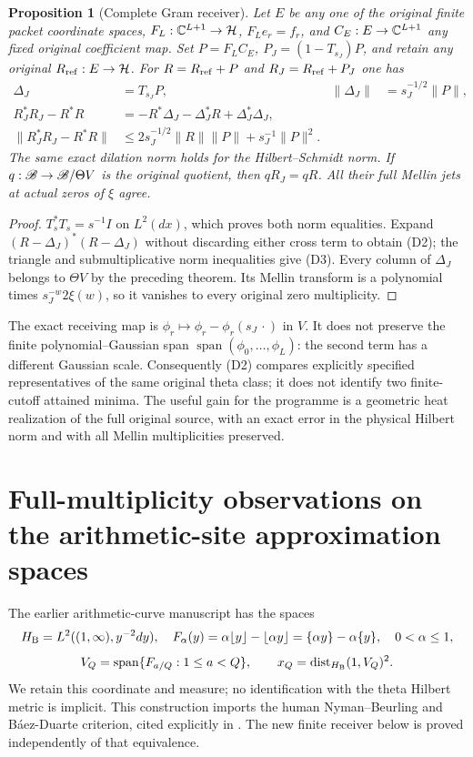 \documentclass[11pt]{article}
\newtheorem{proposition}[theorem]{Proposition}
\begin{document}
\begin{proposition}[Complete Gram receiver]\label{prop:dyadic-gram}
Let $E$ be any one of the original finite packet coordinate spaces,
$F_L:\mathbb C^{L+1}\to\mathcal H$, $F_Le_r=f_r$, and
$C_E:E\to\mathbb C^{L+1}$ any fixed original coefficient map. Set
$P=F_LC_E$, $P_J=(1-T_{s_J})P$, and retain any original
$R_{\rm ref}:E\to\mathcal H$. For $R=R_{\rm ref}+P$ and
$R_J=R_{\rm ref}+P_J$ one has
\begin{align}
 \Delta_J&=T_{s_J}P, & \|\Delta_J\|&=s_J^{-1/2}\|P\|,\nonumber\\
 R_J^*R_J-R^*R
   &=-R^*\Delta_J-\Delta_J^*R+\Delta_J^*\Delta_J,\tag{D2}\\
 \|R_J^*R_J-R^*R\|
   &\leq2s_J^{-1/2}\|R\|\|P\|+s_J^{-1}\|P\|^2.\tag{D3}
\end{align}
The same exact dilation norm holds for the Hilbert--Schmidt norm.
If $q:\mathscr B\to\mathscr B/\Theta V$ is the original quotient, then
$qR_J=qR$. All their full Mellin jets at actual zeros of $\xi$ agree.
\end{proposition}
\begin{proof}
$T_s^*T_s=s^{-1}I$ on $L^2(dx)$, which proves both norm equalities.
Expand $(R-\Delta_J)^*(R-\Delta_J)$ without discarding either cross term
to obtain (D2); the triangle and submultiplicative norm inequalities
give (D3). Every column of $\Delta_J$ belongs to $\Theta V$ by the
preceding theorem. Its Mellin transform is a polynomial times
$s_J^{-w}2\xi(w)$, so it vanishes to every original zero multiplicity.
\end{proof}

The exact receiving map is
$\phi_r\mapsto\phi_r-\phi_r(s_J\,\cdot)$ in $V$.
It does not preserve the finite polynomial--Gaussian span
$\operatorname{span}(\phi_0,\ldots,\phi_L)$: the second term has a
different Gaussian scale. Consequently (D2) compares explicitly specified
representatives of the same original theta class; it does not identify two
finite-cutoff attained minima. The useful gain for the programme is a
geometric heat realization of the full original source, with an exact error
in the physical Hilbert norm and with all Mellin multiplicities preserved.

\section{Full-multiplicity observations on the arithmetic-site approximation spaces}
The earlier arithmetic-curve manuscript has the spaces
\[
 H_{\rm B}=L^2((1,\infty),y^{-2}dy),\quad
 F_\alpha(y)=\alpha\lfloor y\rfloor-\lfloor\alpha y\rfloor
            =\{\alpha y\}-\alpha\{y\},\quad 0<\alpha\leq1,
\]
\[
 V_Q=\operatorname{span}\{F_{a/Q}:1\leq a<Q\},\qquad
 x_Q=\operatorname{dist}_{H_{\rm B}}(1,V_Q)^2.
\]
We retain this coordinate and measure; no identification with the theta
Hilbert metric is implicit. This construction imports the human
Nyman--Beurling and B\'aez-Duarte criterion, cited explicitly in
\cite{cr:Beurling,cr:BD}. The new finite receiver below is proved independently
of that equivalence.
\end{document}
